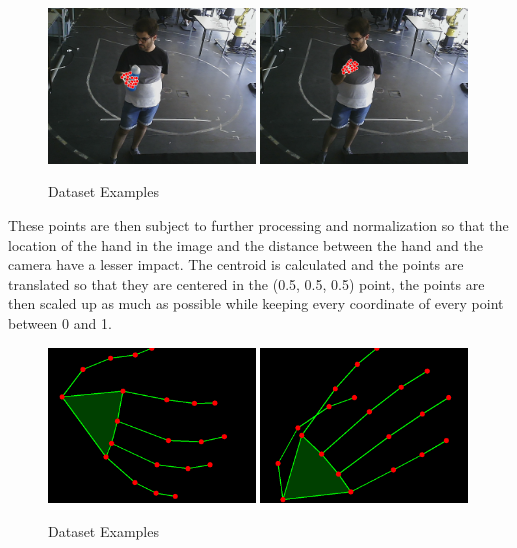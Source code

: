 \begin{figure}[H]
\centerline{\includegraphics[width=0.49\textwidth]{figs/dataset_preprocessing2_1.png} \includegraphics[width=0.49\textwidth]{figs/dataset_preprocessing2_2.png}}
\caption[Dataset Examples]{Dataset Examples}
\label{fig:dataset_examples}
\end{figure}

These points are then subject to further processing and normalization so that the location of the hand in the image and the distance between the hand and the camera have a lesser impact. The centroid is calculated and the points are translated so that they are centered in the (0.5, 0.5, 0.5) point, the points are then scaled up as much as possible while keeping every coordinate of every point between 0 and 1.

\begin{figure}[H]
\centerline{\includegraphics[width=0.49\textwidth]{figs/dataset_preprocessing3_1.png} \includegraphics[width=0.49\textwidth]{figs/dataset_preprocessing3_2.png}}
\caption[Dataset Examples]{Dataset Examples}
\label{fig:dataset_examples}
\end{figure}


